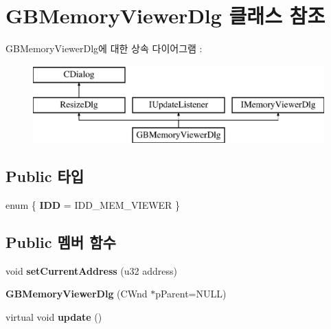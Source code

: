 \hypertarget{class_g_b_memory_viewer_dlg}{}\section{G\+B\+Memory\+Viewer\+Dlg 클래스 참조}
\label{class_g_b_memory_viewer_dlg}
G\+B\+Memory\+Viewer\+Dlg에 대한 상속 다이어그램 \+: \begin{figure}[H]
\begin{center}
\leavevmode
\includegraphics[height=3.000000cm]{class_g_b_memory_viewer_dlg}
\end{center}
\end{figure}
\subsection*{Public 타입}
\begin{DoxyCompactItemize}
\item 
\mbox{\label{class_g_b_memory_viewer_dlg_a9817c54337df4c66ab82b7ea720879a2}} 
enum \{ {\bfseries I\+DD} = I\+D\+D\+\_\+\+M\+E\+M\+\_\+\+V\+I\+E\+W\+ER
 \}
\end{DoxyCompactItemize}
\subsection*{Public 멤버 함수}
\begin{DoxyCompactItemize}
\item 
\mbox{\label{class_g_b_memory_viewer_dlg_a9d6e6bf119f77c2b8843800ae5a6df7b}} 
void {\bfseries set\+Current\+Address} (u32 address)
\item 
\mbox{\label{class_g_b_memory_viewer_dlg_ae3507dbe84b33eb4839ba04b706f3bcc}} 
{\bfseries G\+B\+Memory\+Viewer\+Dlg} (C\+Wnd $\ast$p\+Parent=N\+U\+LL)
\item 
\mbox{\label{class_g_b_memory_viewer_dlg_acb02578600a9ecd38ac653306241089b}} 
virtual void {\bfseries update} ()
\end{DoxyCompactItemize}
